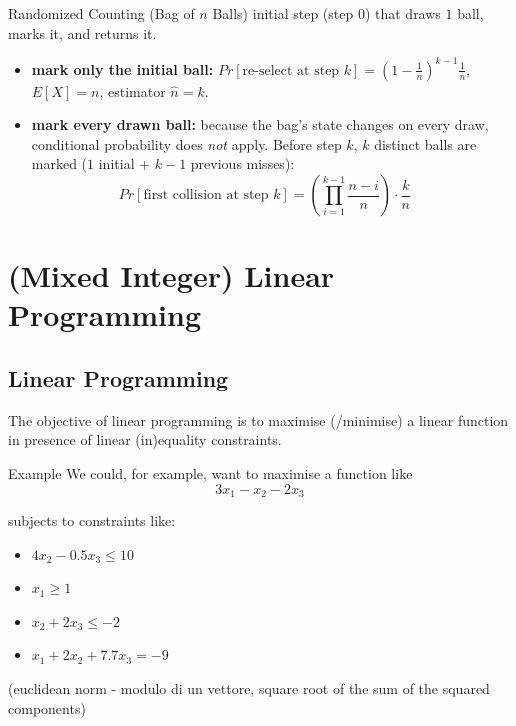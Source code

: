 \documentclass[a4paper, 11pt]{report}
\begin{document}
\begin{gframe}{Randomized Counting (Bag of $n$ Balls)}
    initial step (step $0$) that draws $1$ ball, marks it, and returns it.
    \begin{itemize}
        \item \textbf{mark only the initial ball:} $Pr[\text{re-select at step } k] = \left(1 - \frac{1}{n}\right)^{k-1} \frac{1}{n}$, $E[X] = n$, estimator $\hat{n} = k$.
        \item \textbf{mark every drawn ball:} because the bag's state changes on every draw, conditional probability does \textit{not} apply. Before step $k$, $k$ distinct balls are marked ($1$ initial + $k-1$ previous misses):
            $$Pr[\text{first collision at step } k] = \left(\prod_{i=1}^{k-1} \frac{n - i}{n}\right) \cdot \frac{k}{n} \quad $$
    \end{itemize}
\end{gframe}



\chapter{(Mixed Integer) Linear Programming}
\section{Linear Programming}
The objective of linear programming is to maximise (/minimise) a linear function in presence of linear (in)equality constraints.

\begin{gframe}{Example}
We could, for example, want to maximise a function like
$$3x_{1} - x_{2} -2x_{3}$$

subjects to constraints like:
\begin{itemize}
    \item $4x_{2} - 0.5x_{3} \leq 10$
    \item $x_{1} \geq 1$
    \item $x_{2} + 2x_{3} \leq -2$
    \item $x_{1} + 2x_{2} +7.7x_{3} = -9$
\end{itemize}

\end{gframe}

(euclidean norm - modulo di un vettore, square root of the sum of the squared components)
\end{document}
